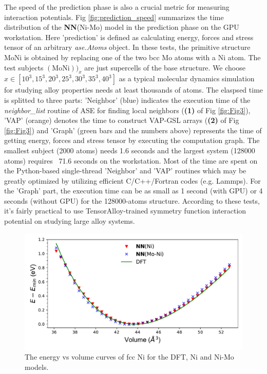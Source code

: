 \documentclass[preprint]{revtex4-2}
\begin{document}
The speed of the prediction phase is also a crucial metric for measuring 
interaction potentials. Fig \ref{fig:prediction_speed} summarizes the time 
distribution of the \textbf{NN}(Ni-Mo) model in the prediction phase on the GPU 
workstation. 
Here 'prediction' is defined as calculating energy, forces and stress tensor of 
an arbitrary \textit{ase.Atoms} object. In these tests, the primitive structure
$\mathrm{MoNi}$ is obtained by replacing one of the two bcc Mo atoms with a Ni 
atom. The test subjects $(\mathrm{MoNi}))_{x}$ are just supercells of the base 
structure. We choose $x \in [10^3, 15^3, 20^3, 25^3, 30^3, 35^3, 40^3]$ as
a typical molecular dynamics simulation for studying alloy properties needs at 
least thousands of atoms. The elaspsed time is splitted to three parts: 
'Neighbor' (blue) indicates the execution time of the \textit{neighbor\_list} 
routine of ASE for finding local neighbors (\textbf{(1)} of Fig \ref{fig:Fig3}),
'VAP' (orange) denotes the time to construct VAP-GSL arrays 
(\textbf{(2)} of Fig \ref{fig:Fig3}) and 'Graph' (green bars and the numbers 
above) represents the time of getting energy, forces and stress tensor by 
executing the computation graph. The smallest subject (2000 atoms) needs 1.6 
seconds and the largest system (128000 atoms) requires ~71.6 seconds on the 
workstation. Most of the time are spent on the Python-based single-thread 
'Neighbor' and 'VAP' routines \textemdash which may be greatly optimized by 
utilizing efficient C/C++/Fortran codes (e.g. Lammps). For the 'Graph' part, the 
execution time can be as small as 1 second (with GPU) or 4 seconds (without GPU) 
for the 128000-atoms structure. According to these tests, it's fairly practical 
to use TensorAlloy-trained symmetry function interaction potential on studying 
large alloy systems.

% 
%
\begin{figure}[h!]
    \centering
    \includegraphics[scale=0.8]{figures/Ni_EoS.pdf}
\caption{\label{fig:energy_volume_Ni} The energy vs volume curves of fcc Ni for
the DFT, Ni and Ni-Mo models.}
\end{figure}
\end{document}
